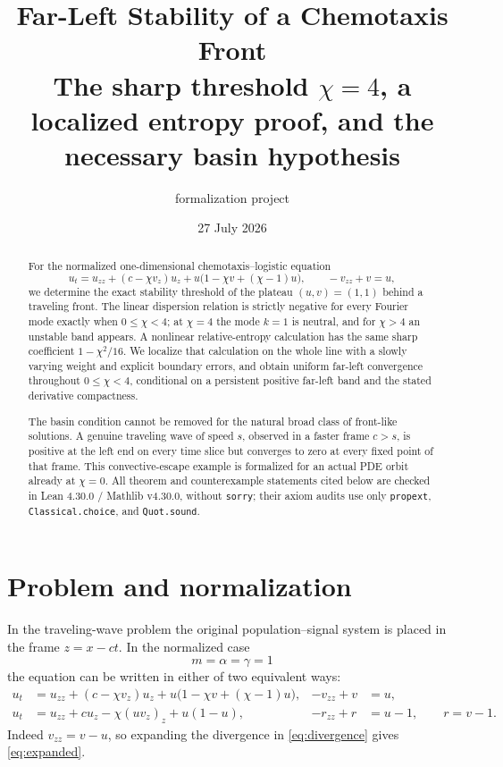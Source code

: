 \documentclass[11pt]{article}
\title{Far-Left Stability of a Chemotaxis Front\\
\large The sharp threshold \(\chi=4\), a localized entropy proof, and the
necessary basin hypothesis}
\author{\code{ShenWork} formalization project}
\date{27 July 2026}
\newcommand{\code}[1]{\nolinkurl{#1}}
\begin{document}
\maketitle

\begin{abstract}
For the normalized one-dimensional chemotaxis--logistic equation
\[
 u_t=u_{zz}+(c-\chi v_z)u_z
      +u\bigl(1-\chi v+(\chi-1)u\bigr),\qquad -v_{zz}+v=u,
\]
we determine the exact stability threshold of the plateau \((u,v)=(1,1)\)
behind a traveling front.  The linear dispersion relation is strictly
negative for every Fourier mode exactly when \(0\le\chi<4\); at \(\chi=4\)
the mode \(k=1\) is neutral, and for \(\chi>4\) an unstable band appears.
A nonlinear relative-entropy calculation has the same sharp coefficient
\(1-\chi^2/16\).  We localize that calculation on the whole line with a
slowly varying weight and explicit boundary errors, and obtain uniform
far-left convergence throughout \(0\le\chi<4\), conditional on a persistent
positive far-left band and the stated derivative compactness.

The basin condition cannot be removed for the natural broad class of
front-like solutions.  A genuine traveling wave of speed \(s\), observed in
a faster frame \(c>s\), is positive at the left end on every time slice but
converges to zero at every fixed point of that frame.  This convective-escape
example is formalized for an actual PDE orbit already at \(\chi=0\).
All theorem and counterexample statements cited below are checked in Lean
4.30.0 / Mathlib v4.30.0, without \code{sorry}; their axiom audits use only
\code{propext}, \code{Classical.choice}, and \code{Quot.sound}.
\end{abstract}

\tableofcontents

\section{Problem and normalization}

In the traveling-wave problem the original population--signal system is
placed in the frame \(z=x-ct\).  In the normalized case
\[
  m=\alpha=\gamma=1
\]
the equation can be written in either of two equivalent ways:
\begin{align}
 u_t
  &=u_{zz}+(c-\chi v_z)u_z
    +u\bigl(1-\chi v+(\chi-1)u\bigr),
    &-v_{zz}+v&=u,                                      \label{eq:expanded}\\
 u_t
  &=u_{zz}+cu_z-\chi(uv_z)_z+u(1-u),
    &-r_{zz}+r&=u-1,\qquad r=v-1.                       \label{eq:divergence}
\end{align}
Indeed \(v_{zz}=v-u\), so expanding the divergence in
\eqref{eq:divergence} gives \eqref{eq:expanded}.
\end{document}
